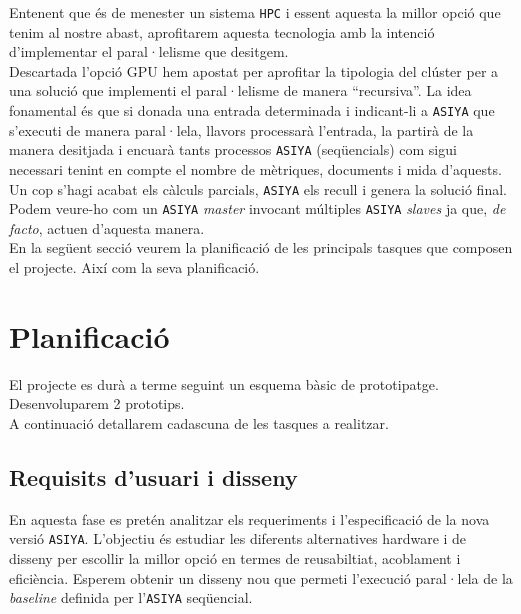 \documentclass[11pt,a4paper]{article}
\begin{document}
Entenent que és de menester un sistema \texttt{HPC} i essent aquesta la millor opció que tenim al nostre abast, aprofitarem aquesta tecnologia amb la intenció d'implementar el paral·lelisme que desitgem. 
\\

Descartada l'opció GPU hem apostat per aprofitar la tipologia del clúster per a una solució que implementi el paral·lelisme de manera ``recursiva''.  La idea fonamental és que si donada una entrada determinada i indicant-li a \texttt{ASIYA} que s'executi de manera paral·lela, llavors processarà l'entrada, la partirà de la manera desitjada i encuarà tants processos \texttt{ASIYA} (seqüencials) com sigui necessari tenint en compte el nombre de mètriques, documents i mida d'aquests. Un cop s'hagi acabat els càlculs parcials, \texttt{ASIYA} els recull i genera la solució final. Podem veure-ho com un \texttt{ASIYA} \emph{master} invocant múltiples \texttt{ASIYA} \emph{slaves} ja que, \textit{de facto}, actuen d'aquesta manera.
\\

En la següent secció veurem la planificació de les principals tasques que composen el projecte. Així com la seva planificació.


\newpage
\section{Planificació}
El projecte es durà a terme seguint un esquema bàsic de prototipatge. Desenvoluparem 2 prototips.
\\

A continuació detallarem cadascuna de les tasques a realitzar.

\subsection{Requisits d'usuari i disseny}
En aquesta fase es pretén analitzar els requeriments i l'especificació de la nova versió \texttt{ASIYA}. L'objectiu és estudiar les diferents alternatives hardware i de disseny per escollir la millor opció en termes de reusabiltiat, acoblament i eficiència. Esperem obtenir un disseny nou que permeti l'execució paral·lela de la \emph{baseline} definida per l'\texttt{ASIYA} seqüencial.
\\
\end{document}
